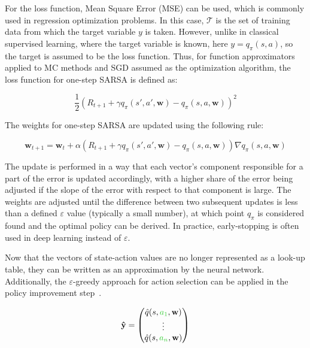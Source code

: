 \documentclass[../xlapes02]{subfiles}
\begin{document}
    For the loss function, Mean Square Error (MSE) can be used, which is commonly used in regression optimization problems. In this case, $\mathcal{T}$ is the set of training data from which the target variable $y$ is taken. However, unlike in classical supervised learning, where the target variable is known, here $y = q_{\pi}(s,a)$, so the target is assumed to be the loss function. Thus, for function approximators applied to MC methods and SGD assumed as the optimization algorithm, the loss function for one-step SARSA is defined as:

    \[ \frac{1}{2} \left( R_{t+1} + \gamma q_{\pi}(s',a', \mathbf{w}) - q_{\pi}(s, a, \mathbf{w}) \right)^2 \]

    The weights for one-step SARSA are updated using the following rule:

    \[ \mathbf{w}_{t+1} = \mathbf{w}_t + \alpha \left( R_{t+1} + \gamma q_{\pi}(s',a', \mathbf{w}) - q_{\pi}(s, a, \mathbf{w}) \right) \nabla q_{\pi}(s, a, \mathbf{w}) \]

    The update is performed in a way that each vector's component responsible for a part of the error is updated accordingly, with a higher share of the error being adjusted if the slope of the error with respect to that component is large. The weights are adjusted until the difference between two subsequent updates is less than a defined $\varepsilon$ value (typically a small number), at which point $q_{\pi}$ is considered found and the optimal policy can be derived. In practice, early-stopping is often used in deep learning instead of $\varepsilon$.

    Now that the vectors of state-action values are no longer represented as a look-up table, they can be written as an approximation by the neural network. Additionally, the $\varepsilon$-greedy approach for action selection can be applied in the policy improvement step~\cite{FITMT25127}.

    \begin{equation}
        \mathbf{\hat{y}} = \begin{pmatrix}
                               \hat{q}(s,\textcolor[RGB]{51,204,51}{a_1}, \mathbf{w}) \\
                               \vdots                                                 \\
                               \hat{q}(s, \textcolor[RGB]{51,204,51}{a_n}, \mathbf{w})
        \end{pmatrix}
    \end{equation}
\end{document}
